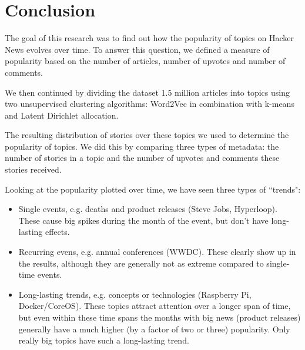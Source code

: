 \section{Conclusion}
The goal of this research was to find out how the popularity of topics on Hacker News evolves over time. To answer this question, we defined a measure of popularity based on the number of articles, number of upvotes and number of comments.

We then continued by dividing the dataset 1.5 million articles into topics using two unsupervised clustering algorithms: Word2Vec in combination with k-means and Latent Dirichlet allocation.

The resulting distribution of stories over these topics we used to determine the popularity of topics. We did this by comparing three types of metadata: the number of stories in a topic and the number of upvotes and comments these stories received.

Looking at the popularity plotted over time, we have seen three types of ``trends":
\begin{itemize}
\item Single events, e.g. deaths and product releases (Steve Jobs, Hyperloop). These cause big spikes during the month of the event, but don't have long-lasting effects.
\item Recurring evens, e.g. annual conferences (WWDC). These clearly show up in the results, although they are generally not as extreme compared to single-time events.
\item Long-lasting trends, e.g. concepts or technologies (Raspberry Pi, Docker/CoreOS). These topics attract attention over a longer span of time, but even within these time spans the months with big news (product releases) generally have a much higher (by a factor of two or three) popularity. Only really big topics have such a long-lasting trend.
\end{itemize}

